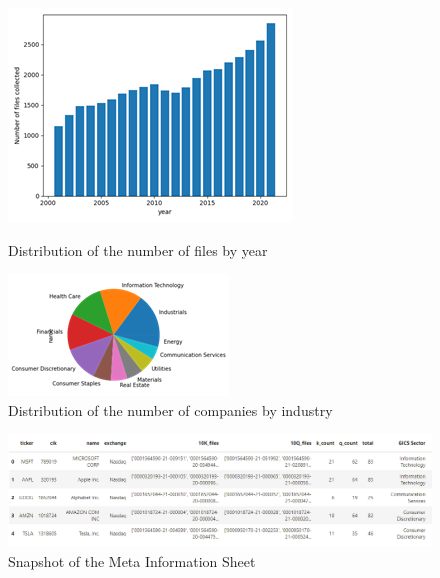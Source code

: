 \begin{figure}[!tbp]
  \centering
  \begin{minipage}[b]{0.45\textwidth}
    \includegraphics[width=\textwidth]{figures/byYear.png}
    \caption{Distribution of the number of files by year}
    \label{fig:byYear}

  \end{minipage}
  \hfill
  \begin{minipage}[b]{0.45\textwidth}
    \includegraphics[width=\textwidth]{figures/byIndustry.png}
    \caption{Distribution of the number of companies by industry}
    \label{fig:byIndustry}

  \end{minipage}
\end{figure}


\begin{figure}[h!]
\centering
  \includegraphics [width=\textwidth]{figures/meta.png}
  \caption{Snapshot of the Meta Information Sheet}
  \label{fig:meta}
\end{figure}



